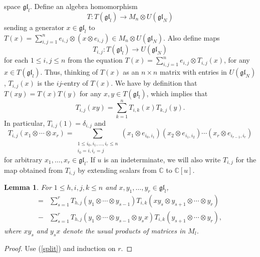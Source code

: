 \documentclass[twoside,12pt,reqno]{amsart}
\newtheorem{Lemma}[Proposition]{Lemma}
\def\C{{\mathbb C}}
\def\Mat{M}
\begin{document}
space $\mathfrak{gl}_l$.
Define an algebra homomorphism
\begin{equation}\label{t1}
T: T(\mathfrak{gl}_l) \rightarrow \Mat_n \otimes U(\mathfrak{gl}_{N})
\end{equation}
sending a generator $x \in \mathfrak{gl}_l$ to 
$T(x) = \sum_{i,j=1}^n 
e_{i,j} \otimes (x \otimes e_{i,j}) \in \Mat_n \otimes U(\mathfrak{gl}_{N})$.
Also define maps 
\begin{equation}\label{ijv}
T_{i,j}: T(\mathfrak{gl}_l) 
\rightarrow U(\mathfrak{gl}_{N})
\end{equation}
for each $1 \leq i,j \leq n$ from the equation
$T(x) = \sum_{i,j=1}^n e_{i,j} \otimes T_{i,j}(x)$,
for any $x \in T(\mathfrak{gl}_l)$.
Thus, thinking of $T(x)$ as an $n\times n$ matrix with entries in
$U(\mathfrak{gl}_{N})$, $T_{i,j}(x)$ is the $ij$-entry of $T(x)$.
We have by definition that $T(xy) =T(x) T(y)$
for any $x,y \in T(\mathfrak{gl}_l)$, which implies that
\begin{equation}
T_{i,j} (x y) = \sum_{k=1}^n T_{i,k}(x) T_{k,j}(y).
\label{split}
\end{equation}
In particular, $T_{i,j}(1) = \delta_{i,j}$ and
\begin{equation}\label{ijv3}
T_{i,j}(x_1 \otimes \cdots \otimes x_r)= \sum_{\substack{1 \leq 
i_0,i_1,\dots,i_r \leq n \\ i_0 = i, i_r = j}}\!\!\!\!\!
(x_1 \otimes e_{i_0,i_1})(x_2 \otimes e_{i_1, i_2}) 
\cdots (x_r \otimes e_{i_{r-1},i_r})
\end{equation}
for arbitrary $x_1,\dots,x_r \in \mathfrak{gl}_l$.
If $u$ is an indeterminate, we will also write 
$T_{i,j}$
for the map obtained from $T_{i,j}$ 
by extending scalars from $\C$ to $\C[u]$.

\begin{Lemma}\label{Easy}
For $1 \leq h,i,j,k \leq n$
and $x,y_1,\dots,y_r \in \mathfrak{gl}_l$,
\begin{align*}
[T_{i,j}(x), T_{h,k}(y_1\otimes\cdots\otimes y_r)]
=
&\sum_{s=1}^r 
T_{h,j}(y_1\otimes\cdots\otimes y_{s-1}) T_{i,k}(x y_s \otimes
y_{s+1}
\otimes \cdots \otimes y_r)
\\
-&\sum_{s=1}^r
T_{h,j}(y_1\otimes\cdots\otimes y_{s-1}\otimes y_{s} x) T_{i,k}(
y_{s+1}
\otimes \cdots \otimes y_r),
\end{align*}
where $xy_s$ and $y_sx$ denote the usual products of matrices  
in $\Mat_l$.
\end{Lemma}

\begin{proof}
Use (\ref{split}) and induction on $r$.
\end{proof}
\end{document}
